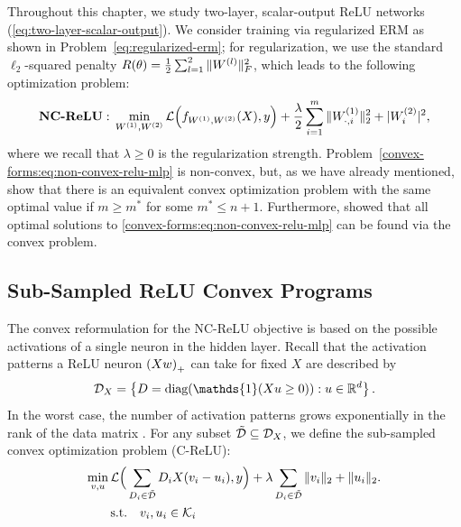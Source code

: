 
Throughout this chapter, we study two-layer, scalar-output ReLU networks
(\cref{eq:two-layer-scalar-output}).
We consider training via regularized ERM as shown in
Problem~\ref{eq:regularized-erm};
for regularization, we use the standard \( \ell_2 \)-squared penalty
\( R(\theta) = \frac{1}{2} \sum_{l=1}^2 \|W^{(l)}\|_F^2 \), which leads to the
following optimization problem:
\begin{equation}\label{convex-forms:eq:non-convex-relu-mlp}
    \textbf{NC-ReLU}: \, \min_{W^{(1)}, W^{(2)}}   \mathcal{L}\Big(f_{W^{(1)}, W^{(2)}}(X), y \Big)
    + \frac{\lambda}{2}\sum_{i=1}^m \|W^{(1)}_{\cdot, i}\|_2^2 + |W^{(2)}_{i}|^2,
\end{equation}
where we recall that \( \lambda \geq 0 \) is the regularization strength.
Problem~\ref{convex-forms:eq:non-convex-relu-mlp} is non-convex, but, as we
have already mentioned, \citet{pilanci2020convexnn} show that there is an
equivalent convex optimization problem with the same optimal value if \( m \geq
m^* \) for some \( m^* \leq n + 1 \).
Furthermore, \citet{wang2022hidden} showed that all optimal solutions to
\eqref{convex-forms:eq:non-convex-relu-mlp} can be found via the convex
problem.

\subsection{Sub-Sampled ReLU Convex Programs}\label{sec:relu-models}

The convex reformulation for the NC-ReLU objective is based on
the possible activations of a single neuron in the hidden layer.
Recall that the activation patterns a ReLU neuron \( \left(X w\right)_{+} \) can take
for fixed \( X \) are described by
\[ \calD_X = \cbr{D = \diag(\mathds{1}(X u \geq 0)) : u \in \R^d}. \]
In the worst case, the number of activation patterns grows exponentially in the
rank of the data matrix \citep{pilanci2020convexnn}.
For any subset \( \tilde {\mathcal{D}} \subseteq \mathcal{D}_X \), we define the sub-sampled
convex optimization problem (C-ReLU):
\begin{equation}\label{convex-forms:eq:convex-relu-mlp}
    \begin{aligned}
        \min_{v, u} \, & \mathcal{L}\Big(  \sum_{D_i \in \tilde {\mathcal{D}}}   D_i X (v_i  -  u_i), y\Big) + \lambda \sum_{D_i \in \tilde {\mathcal{D}}} \|v_i\|_2 + \|u_i\|_2. \\
                       & \text{s.t.} \quad v_i, u_i \in \mathcal{K}_i
    \end{aligned}
\end{equation}

